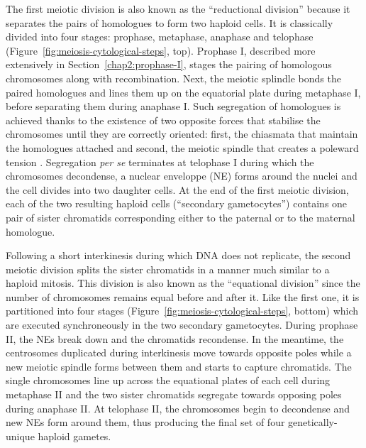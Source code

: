 The first meiotic division is also known as the “reductional division” because it separates the pairs of homologues to form two haploid cells. 
It is classically divided into four stages: prophase, metaphase, anaphase and telophase (Figure~\ref{fig:meiosis-cytological-steps}, top).
Prophase I, described more extensively in Section~\ref{chap2:prophase-I}, stages the pairing of homologous chromosomes along with recombination.
Next, the meiotic splindle bonds the paired homologues and lines them up on the equatorial plate during metaphase I, before separating them during anaphase I. 
Such segregation of homologues is achieved thanks to the existence of two opposite forces that stabilise the chromosomes until they are correctly oriented: first, the chiasmata that maintain the homologues attached and second, the meiotic spindle that creates a poleward tension \citep{petronczki2003menage}.
Segregation \textit{per se} terminates at telophase I during which the chromosomes decondense, a nuclear enveloppe (NE) forms around the nuclei and the cell divides into two daughter cells.
At the end of the first meiotic division, each of the two resulting haploid cells (“secondary gametocytes”) contains one pair of sister chromatids corresponding either to the paternal or to the maternal homologue.

Following a short interkinesis during which DNA does not replicate, the second meiotic division splits the sister chromatids in a manner much similar to a haploid mitosis. 
This division is also known as the “equational division” since the number of chromosomes remains equal before and after it.
Like the first one, it is partitioned into four stages (Figure~\ref{fig:meiosis-cytological-steps}, bottom) which are executed synchroneously in the two secondary gametocytes.
During prophase II, the NEs break down and the chromatids recondense. In the meantime, the centrosomes duplicated during interkinesis move towards opposite poles while a new meiotic spindle forms between them and starts to capture chromatids.
The single chromosomes line up across the equational plates of each cell during metaphase II and the two sister chromatids segregate towards opposing poles during anaphase II\@.
At telophase II, the chromosomes begin to decondense and new NEs form around them, thus producing the final set of four genetically-unique haploid gametes.\\



